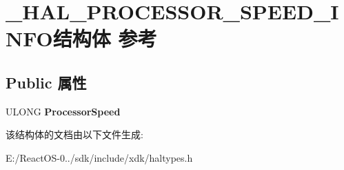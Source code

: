 \hypertarget{struct___h_a_l___p_r_o_c_e_s_s_o_r___s_p_e_e_d___i_n_f_o}{}\section{\+\_\+\+H\+A\+L\+\_\+\+P\+R\+O\+C\+E\+S\+S\+O\+R\+\_\+\+S\+P\+E\+E\+D\+\_\+\+I\+N\+F\+O结构体 参考}
\label{struct___h_a_l___p_r_o_c_e_s_s_o_r___s_p_e_e_d___i_n_f_o}
\subsection*{Public 属性}
\begin{DoxyCompactItemize}
\item 
\mbox{\label{struct___h_a_l___p_r_o_c_e_s_s_o_r___s_p_e_e_d___i_n_f_o_a2e26c8a81b64b1d3a2a29465cd778baf}} 
U\+L\+O\+NG {\bfseries Processor\+Speed}
\end{DoxyCompactItemize}


该结构体的文档由以下文件生成\+:\begin{DoxyCompactItemize}
\item 
E\+:/\+React\+O\+S-\/0../sdk/include/xdk/haltypes.\+h\end{DoxyCompactItemize}
